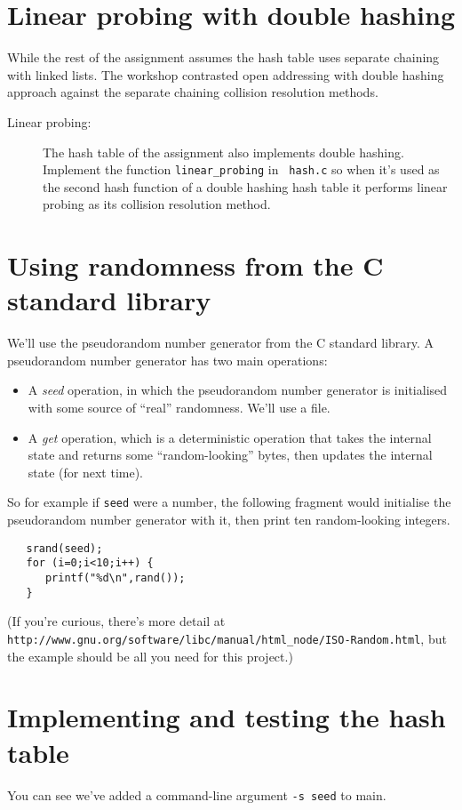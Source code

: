 \documentclass[11pt]{article}
\begin{document}
\section*{Linear probing with double hashing}
While the rest of the assignment assumes the hash table uses separate
chaining with linked lists. The workshop contrasted open addressing with
double hashing approach against the separate chaining collision resolution
methods.

\begin{description}
    \item[Linear probing:] The hash table of the assignment also implements
        double hashing. Implement the function {\tt linear\_probing} in {\tt
        hash.c} so when it's used as the second hash function of a double
        hashing hash table it performs linear probing as its collision
        resolution method.
\end{description}

\section*{Using randomness from the C standard library}
We'll use the pseudorandom number generator from the C standard library.  A
pseudorandom number generator has two main operations:
\begin{itemize}
\item A \emph{seed} operation, in which the pseudorandom number generator is
    initialised with some source of ``real'' randomness.  We'll use a file.
\item A \emph{get} operation, which is a deterministic operation that takes the
    internal state and returns some ``random-looking'' bytes, then updates the
        internal state (for next time).
\end{itemize}
So for example if {\tt seed} were a number, the following fragment would
initialise the pseudorandom number generator with it, then print ten
random-looking integers.

\begin{verbatim}
   srand(seed);
   for (i=0;i<10;i++) {
      printf("%d\n",rand());
   }
\end{verbatim}

(If you're curious, there's more detail at {\tt
http://www.gnu.org/software/libc/manual/html\_node/ISO-Random.html}, but the
example should be all you need for this project.)

\section*{Implementing and testing the hash table} You can see we've added a
command-line argument {\tt -s seed} to main.
\end{document}
